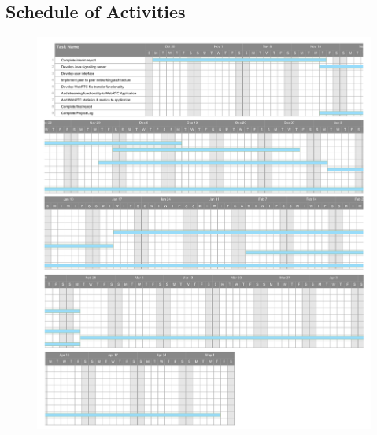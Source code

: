 \documentclass[]{report}
\begin{document}
			\newpage
			\subsection*{Schedule of Activities}
			\begin{figure}[h!]
				\includegraphics[scale=0.5]{ganttchart.png}
			\end{figure}
			\newpage	
			
\end{document}
